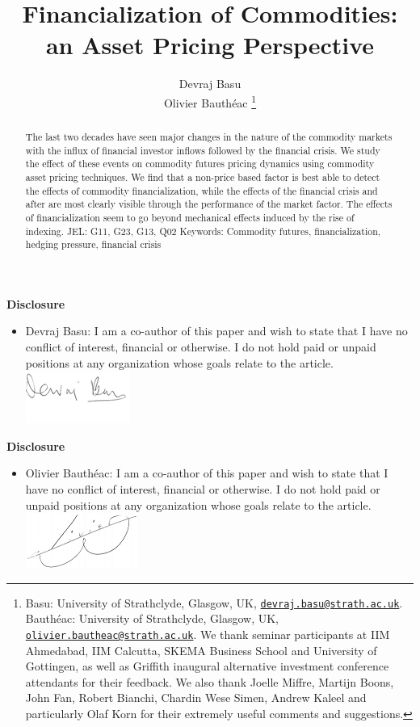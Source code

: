 \documentclass[12pt,]{article}
\title{Financialization of Commodities: an Asset Pricing Perspective}
\author{ Devraj Basu  \\  Olivier Bauthéac  
	  \thanks{ Basu: University of Strathclyde, Glasgow, UK, \href{mailto:devraj.basu@strath.ac.uk}{\nolinkurl{devraj.basu@strath.ac.uk}}.  Bauthéac: University of Strathclyde, Glasgow, UK, \href{mailto:olivier.bautheac@strath.ac.uk}{\nolinkurl{olivier.bautheac@strath.ac.uk}}. 	  
	   \newline We thank seminar participants at IIM Ahmedabad, IIM Calcutta, SKEMA
Business School and University of Gottingen, as well as Griffith
inaugural alternative investment conference attendants for their
feedback. We also thank Joelle Miffre, Martijn Boons, John Fan, Robert
Bianchi, Chardin Wese Simen, Andrew Kaleel and particularly Olaf Korn
for their extremely useful comments and suggestions.  }
  }
\date{}
\providecommand{\tightlist}{%
  \setlength{\itemsep}{0pt}\setlength{\parskip}{0pt}}
\begin{document}
\maketitle
\begin{abstract}
The last two decades have seen major changes in the nature of the
commodity markets with the influx of financial investor inflows followed
by the financial crisis. We study the effect of these events on
commodity futures pricing dynamics using commodity asset pricing
techniques. We find that a non-price based factor is best able to detect
the effects of commodity financialization, while the effects of the
financial crisis and after are most clearly visible through the
performance of the market factor. The effects of financialization seem
to go beyond mechanical effects induced by the rise of indexing. 
\newline
JEL: G11, G23, G13, Q02
\newline
Keywords: Commodity futures, financialization, hedging pressure, financial crisis

\end{abstract}


\newpage

\textbf{Disclosure}

\begin{itemize}
\tightlist
\item
  Devraj Basu: I am a co-author of this paper and wish to state that I
  have no conflict of interest, financial or otherwise. I do not hold
  paid or unpaid positions at any organization whose goals relate to the
  article.\\
  \includegraphics{pics/signature - Devraj.png}\\
\end{itemize}

\newpage

\textbf{Disclosure}

\begin{itemize}
\tightlist
\item
  Olivier Bauthéac: I am a co-author of this paper and wish to state
  that I have no conflict of interest, financial or otherwise. I do not
  hold paid or unpaid positions at any organization whose goals relate
  to the article.\\
  \includegraphics{pics/signature - Olivier.png}\\
\end{itemize}
\end{document}

